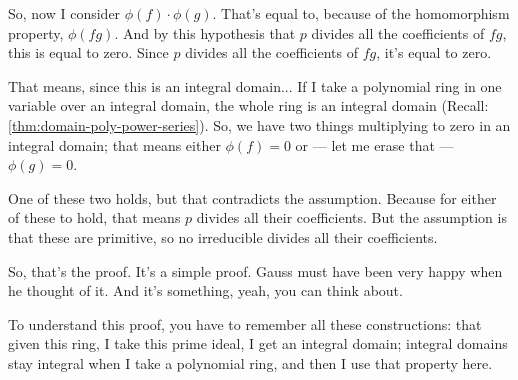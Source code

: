 \begin{speech}[00:13:25 - 00:15:16]
So, now I consider $\phi(f) \cdot \phi(g)$. That's equal to, because of the homomorphism property, $\phi(fg)$.  And by this hypothesis that $p$ divides all the coefficients of $fg$, this is equal to zero.  Since $p$ divides all the coefficients of $fg$, it's equal to zero.

That means, since this is an integral domain... If I take a polynomial ring in one variable over an integral domain, the whole ring is an integral domain (Recall: \cref{thm:domain-poly-power-series}). So, we have two things multiplying to zero in an integral domain; that means either $\phi(f) = 0$ or --- let me erase that --- $\phi(g) = 0$. 

One of these two holds, but that contradicts the assumption. Because for either of these to hold, that means $p$ divides all their coefficients. But the assumption is that these are primitive, so no irreducible divides all their coefficients.

So, that's the proof. It's a simple proof. Gauss must have been very happy when he thought of it. And it's something, yeah, you can think about.

To understand this proof, you have to remember all these constructions: that given this ring, I take this prime ideal, I get an integral domain; integral domains stay integral when I take a polynomial ring, and then I use that property here.
\end{speech}

